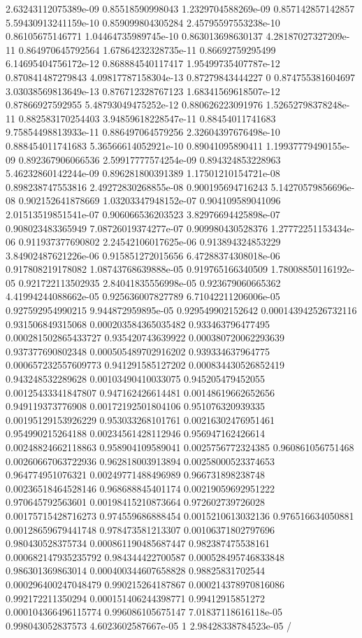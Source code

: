 \begin{table}
\begin{tabu}
\begin{sparkline}{10}
2.63243112075389e-09 0.85518590998043 1.2329704588269e-09 0.857142857142857 5.59430913241159e-10 0.859099804305284 2.45795597553238e-10 0.86105675146771 1.04464735989745e-10 0.863013698630137 4.28187027327209e-11 0.864970645792564 1.67864232328735e-11 0.86692759295499 6.14695404756172e-12 0.868884540117417 1.95499735407787e-12 0.870841487279843 4.09817787158304e-13 0.87279843444227 0 0.874755381604697 3.03038569813649e-13 0.876712328767123 1.68341569618507e-12 0.87866927592955 5.48793049475252e-12 0.880626223091976 1.52652798378248e-11 0.882583170254403 3.94859618228547e-11 0.88454011741683 9.75854498813933e-11 0.886497064579256 2.32604397676498e-10 0.888454011741683 5.36566614052921e-10 0.89041095890411 1.19937779490155e-09 0.892367906066536 2.59917777574254e-09 0.894324853228963 5.46232860142244e-09 0.896281800391389 1.17501210154721e-08 0.898238747553816 2.49272830268855e-08 0.900195694716243 5.14270579856696e-08 0.902152641878669 1.03203347948152e-07 0.904109589041096 2.01513519851541e-07 0.906066536203523 3.82976694425898e-07 0.908023483365949 7.08726019374277e-07 0.909980430528376 1.27772251153434e-06 0.911937377690802 2.24542106017625e-06 0.913894324853229 3.84902487621226e-06 0.915851272015656 6.47288374308018e-06 0.917808219178082 1.08743768639888e-05 0.919765166340509 1.78008850116192e-05 0.921722113502935 2.84041835556998e-05 0.923679060665362 4.41994244088662e-05 0.925636007827789 6.71042211206006e-05 0.927592954990215 9.944872959895e-05 0.929549902152642 0.000143942526732116 0.931506849315068 0.000203584365035482 0.933463796477495 0.000281502865433727 0.935420743639922 0.000380720062293639 0.937377690802348 0.000505489702916202 0.939334637964775 0.000657232557609773 0.941291585127202 0.000834430526852419 0.943248532289628 0.00103490410033075 0.945205479452055 0.00125433341847807 0.947162426614481 0.00148619662652656 0.949119373776908 0.00172192501804106 0.951076320939335 0.00195129153926229 0.953033268101761 0.00216302476951461 0.954990215264188 0.00234561428112946 0.956947162426614 0.00248824662118863 0.958904109589041 0.0025756772324385 0.960861056751468 0.00260667063722936 0.962818003913894 0.00258000523374653 0.964774951076321 0.00249771488496989 0.966731898238748 0.00236518464528146 0.968688845401174 0.00219059692951222 0.970645792563601 0.00198415210873664 0.972602739726028 0.00175715428716273 0.974559686888454 0.0015210613032136 0.976516634050881 0.00128659679441748 0.978473581213307 0.00106371802797696 0.980430528375734 0.000861190485687447 0.982387475538161 0.000682147935235792 0.984344422700587 0.000528495746833848 0.986301369863014 0.000400344607658828 0.98825831702544 0.000296400247048479 0.990215264187867 0.000214378970816086 0.992172211350294 0.000151406244398771 0.99412915851272 0.000104366496115774 0.996086105675147 7.01837118616118e-05 0.998043052837573 4.6023602587667e-05 1 2.98428338784523e-05 /

\end{sparkline}
\end{tabu}
\end{table}
